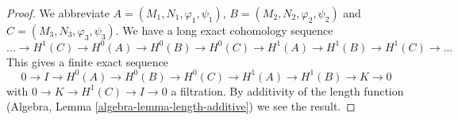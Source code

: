 \documentclass[10pt,a4paper]{amsart}
\theoremstyle{plain}
\theoremstyle{definition}
\theoremstyle{remark}
\numberwithin{equation}{subsection}
\begin{document}
\begin{proof}
We abbreviate $A = (M_1, N_1, \varphi_1, \psi_1)$,
$B = (M_2, N_2, \varphi_2, \psi_2)$ and $C = (M_3, N_3, \varphi_3, \psi_3)$.
We have a long exact cohomology sequence
$$
\ldots
\to H^1(C)
\to H^0(A)
\to H^0(B)
\to H^0(C)
\to H^1(A)
\to H^1(B)
\to H^1(C)
\to \ldots
$$
This gives a finite exact sequence
$$
0 \to I
\to H^0(A)
\to H^0(B)
\to H^0(C)
\to H^1(A)
\to H^1(B)
\to K \to 0
$$
with $0 \to K \to H^1(C) \to I \to 0$ a filtration. By additivity of
the length function (Algebra, Lemma \ref{algebra-lemma-length-additive})
we see the result.
\end{proof}
\end{document}
